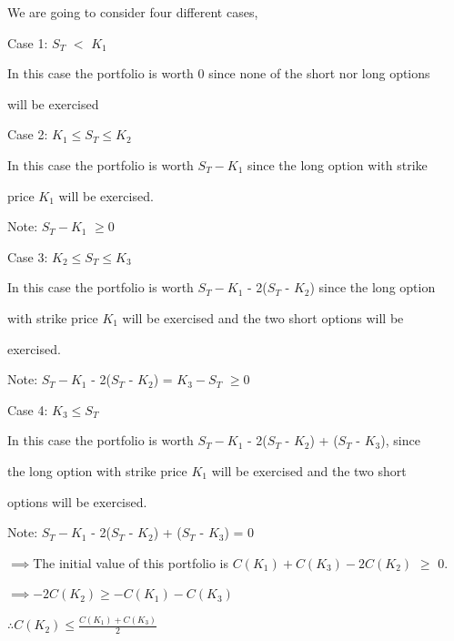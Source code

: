 \documentclass{article}
\begin{document}
We are going to consider four different cases,

\vspace{\baselineskip}

Case 1: $S_T$ $<$ $K_1$

In this case the portfolio is worth 0 since none of the short nor long options 

will be exercised

\vspace{\baselineskip}

Case 2: $K_1 \leq S_T \leq K_2$

In this case the portfolio is worth $S_T - K_1$ since the long option with strike 

price $K_1$ will be exercised.

Note: $S_T - K_1$  $\geq 0$

\vspace{\baselineskip}

Case 3: $K_2 \leq S_T \leq K_3$

In this case the portfolio is worth $S_T - K_1$ - 2($S_T$ - $K_2$) since the long option 

with strike price $K_1$ will be exercised and the two short options will be 

exercised.

Note: $S_T - K_1$ - 2($S_T$ - $K_2$) = $K_3 - S_T$ $\geq 0$

\vspace{\baselineskip}

Case 4: $K_3 \leq S_T$

In this case the portfolio is worth $S_T - K_1$ - 2($S_T$ - $K_2$) + ($S_T$ - $K_3$), since 

the long option with strike price $K_1$ will be exercised and the two short 

options will be exercised.

Note: $S_T - K_1$ - 2($S_T$ - $K_2$) + ($S_T$ - $K_3$) = 0 

\vspace{\baselineskip}

$\implies $The initial value of this portfolio is $C(K_1) + C(K_3) - 2C(K_2)$ $\geq$ 0.


\vspace{\baselineskip}

$\implies - 2C(K_2) \geq  - C(K_1) - C(K_3)$

\vspace{\baselineskip}

$\therefore C(K_2)\leq \frac{C(K_1)+C(K_3)}{2}$  
\end{document}
